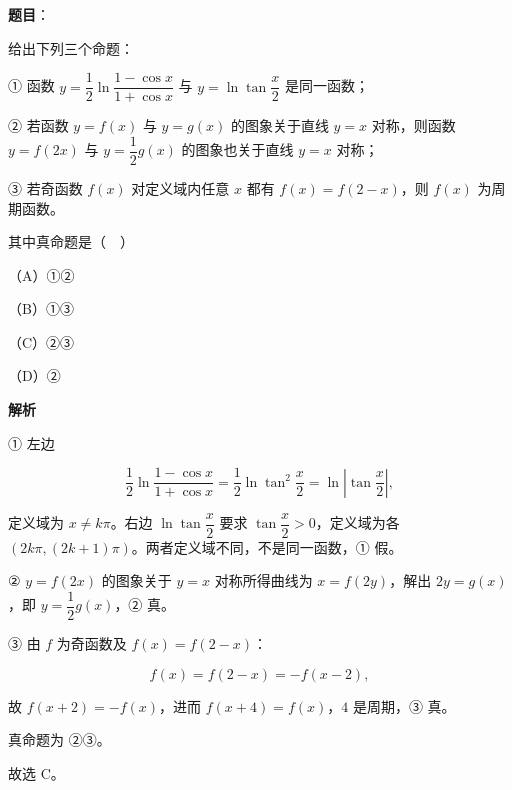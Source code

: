 \begin{answer}

\textbf{题目}：

给出下列三个命题：

① 函数 $y=\dfrac12\ln\dfrac{1-\cos x}{1+\cos x}$ 与 $y=\ln\tan\dfrac x2$ 是同一函数；

② 若函数 $y=f(x)$ 与 $y=g(x)$ 的图象关于直线 $y=x$ 对称，则函数 $y=f(2x)$ 与 $y=\dfrac12g(x)$ 的图象也关于直线 $y=x$ 对称；

③ 若奇函数 $f(x)$ 对定义域内任意 $x$ 都有 $f(x)=f(2-x)$，则 $f(x)$ 为周期函数。

其中真命题是（　）

（A）①②

（B）①③

（C）②③

（D）②

\textbf{解析}

① 左边

\nopagebreak[4]
\[\frac12\ln\frac{1-\cos x}{1+\cos x}
=\frac12\ln\tan^2\frac x2=\ln\left|\tan\frac x2\right|,\]

定义域为 $x\neq k\pi$。右边 $\ln\tan\dfrac x2$ 要求 $\tan\dfrac x2>0$，定义域为各 $(2k\pi,(2k+1)\pi)$。两者定义域不同，不是同一函数，① 假。

② $y=f(2x)$ 的图象关于 $y=x$ 对称所得曲线为 $x=f(2y)$，解出 $2y=g(x)$，即 $y=\dfrac12g(x)$，② 真。

③ 由 $f$ 为奇函数及 $f(x)=f(2-x)$：

\nopagebreak[4]
\[f(x)=f(2-x)=-f(x-2),\]

故 $f(x+2)=-f(x)$，进而 $f(x+4)=f(x)$，$4$ 是周期，③ 真。

真命题为 ②③。

故选 C。


\end{answer}
